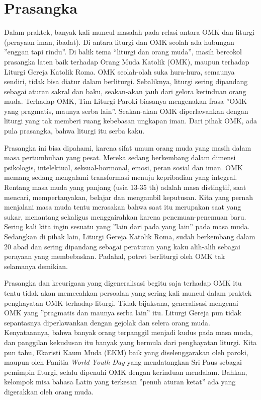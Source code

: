 
\section*{Prasangka}
\small
Dalam praktek, banyak kali muncul masalah pada relasi antara OMK dan liturgi (perayaan iman, ibadat). Di antara liturgi dan OMK seolah ada hubungan ”enggan tapi rindu”. Di balik tema “liturgi dan orang muda”, masih bercokol  prasangka laten baik terhadap Orang Muda Katolik (OMK), maupun terhadap Liturgi Gereja Katolik Roma. OMK seolah-olah suka hura-hura, semaunya sendiri, tidak bisa diatur dalam berliturgi. Sebaliknya, liturgi sering dipandang sebagai aturan sakral dan baku, seakan-akan jauh dari gelora kerinduan orang muda. Terhadap OMK, Tim Liturgi Paroki biasanya mengenakan frasa ”OMK yang pragmatis, maunya serba lain”. Seakan-akan OMK diperlawankan dengan liturgi yang tak memberi ruang kebebasan ungkapan iman. Dari pihak OMK, ada pula prasangka, bahwa liturgi itu serba  kaku.

Prasangka ini  bisa dipahami, karena sifat umum orang muda yang masih dalam masa pertumbuhan yang pesat. Mereka sedang berkembang dalam dimensi psikologis, intelektual, seksual-hormonal, emosi, peran sosial dan iman. OMK memang sedang  mengalami transformasi menuju kepribadian yang integral. Rentang masa muda yang panjang (usia 13-35 th) adalah masa distingtif,  saat mencari, mempertanyakan, belajar dan mengambil keputusan. Kita yang pernah menjalani masa muda tentu merasakan bahwa saat itu merupakan saat yang sukar, menantang sekaligus menggairahkan karena penemuan-penemuan baru. Sering kali kita ingin sesuatu yang ”lain dari pada yang lain” pada masa muda. Sedangkan di pihak lain, Liturgi Gereja Katolik Roma, sudah berkembang dalam 20 abad dan sering dipandang sebagai peraturan yang kaku alih-alih sebagai perayaan yang membebaskan. Padahal, potret berliturgi oleh OMK tak selamanya demikian.

Prasangka dan kecurigaan  yang digeneralisasi begitu saja terhadap OMK itu tentu tidak akan memecahkan persoalan yang sering kali muncul dalam praktek penghayatan OMK terhadap liturgi. Tidak bijaksana,  generalisasi mengenai OMK yang ”pragmatis dan maunya serba lain” itu. Liturgi Gereja pun tidak sepantasnya diperlawankan dengan gejolak dan selera orang muda. Kenyataannya, bahwa banyak orang terpanggil menjadi kudus pada masa muda, dan panggilan kekudusan itu banyak yang bermula dari penghayatan liturgi. Kita pun tahu, Ekaristi Kaum Muda (EKM) baik yang diselenggarakan oleh paroki, maupun oleh Panitia \textit{World Youth Day} yang mendatangkan Sri Paus sebagai pemimpin liturgi, selalu dipenuhi OMK dengan kerinduan mendalam. Bahkan, kelompok misa bahasa Latin yang terkesan ”penuh aturan ketat” ada yang digerakkan  oleh orang muda.

